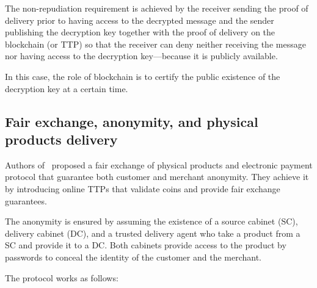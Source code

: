 \documentclass{ieeeaccess}
\begin{document}
The non-repudiation requirement is achieved by the receiver sending the proof of delivery prior to having access to the decrypted message and the sender publishing the decryption key together with the proof of delivery on the blockchain (or TTP) so that the receiver can deny neither receiving the message nor having access to the decryption key—because it is publicly available.

In this case, the role of blockchain is to certify the public existence of the decryption key at a certain time.

\subsection{Fair exchange, anonymity, and physical products delivery} 
\label{anonymity-and-fair-exchange-in-e-commerce-protocol-for-physical-products-delivery}

Authors of~\cite{birjoveanuAnonymityFairexchangeEcommerce2015} proposed a
fair exchange of physical products and electronic payment protocol that
guarantee both customer and merchant anonymity. They achieve it by introducing online TTPs that validate coins and provide
fair exchange guarantees.

The anonymity is ensured by assuming the existence of a source cabinet (SC), delivery cabinet (DC), and a trusted delivery agent who take a product from a SC and provide it to a DC.
Both cabinets provide access to the product by passwords to conceal
the identity of the customer and the merchant.

The protocol works as follows: \begingroup
\renewcommand{\labelenumii}{\arabic{enumii}.}
\end{document}
